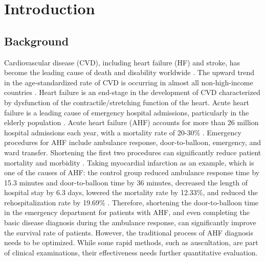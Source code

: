 \section{Introduction}\label{sec:introduction}
\subsection{Background}
Cardiovascular disease (CVD), including heart failure (HF) and stroke, has become the leading cause of death and disability worldwide \cite{virani2020heart,roth2020global,mensah2019global,boorsma2020congestion}. The upward trend in the age-standardized rate of CVD is occurring in almost all non-high-income countries \cite{roth2020global}. Heart failure is an end-stage in the development of CVD characterized by dysfunction of the contractile/stretching function of the heart. Acute heart failure is a leading cause of emergency hospital admissions,  particularly in the elderly population \cite{sinnenberg2020acute,arrigo2020acute}. Acute heart failure (AHF) accounts for more than 26 million hospital admissions each year, with a mortality rate of 20-30\%  \cite{chapman2019clinical}. Emergency procedures for AHF include ambulance response, door-to-balloon, emergency, and ward transfer. Shortening the first two procedures can significantly reduce patient mortality and morbidity \cite{victor2012door,fan2021effects}. Taking myocardial infarction as an example, which is one of the causes of AHF: the control group reduced ambulance response time by 15.3 minutes and door-to-balloon time by 36 minutes, decreased the length of hospital stay by 6.3 days, lowered the mortality rate by 12.33\%, and reduced the rehospitalization rate by 19.69\% \cite{fan2021effects}. Therefore, shortening the door-to-balloon time in the emergency department for patients with AHF, and even completing the basic disease diagnosis during the ambulance response, can significantly improve the survival rate of patients. However, the traditional process of AHF diagnosis needs to be optimized. While some rapid methods, such as auscultation, are part of clinical examinations, their effectiveness needs further quantitative evaluation.

